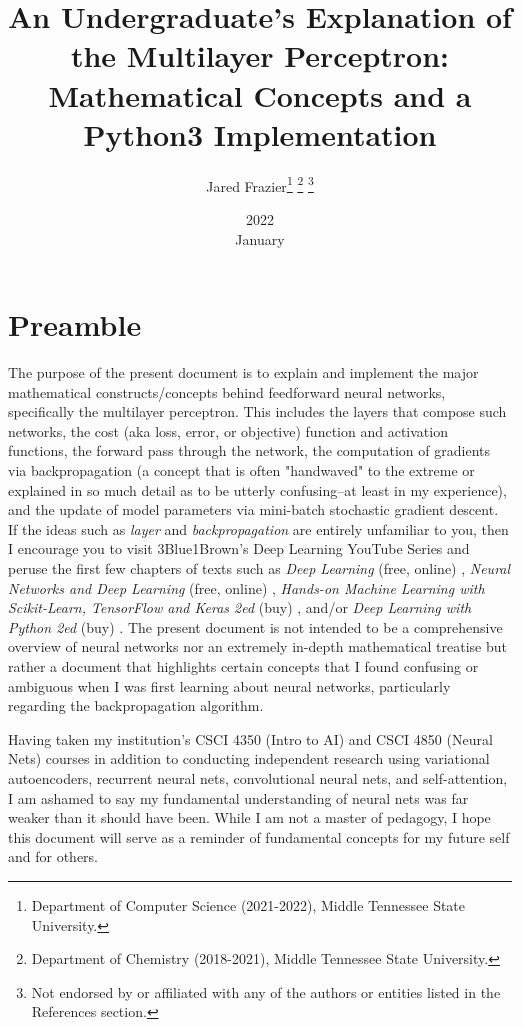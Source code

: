 \documentclass{article}
\title{
	An Undergraduate's Explanation of the Multilayer Perceptron: 
	Mathematical Concepts and a Python3 Implementation}
\date{2022 \\ January}
\author{Jared Frazier\thanks{Department of Computer Science (2021-2022),
Middle Tennessee State University.} \thanks{Department of Chemistry (2018-2021),
Middle Tennessee State University.} \thanks{Not endorsed by or affiliated with any of the 
authors or entities listed in the References section.}}
\begin{document}
\maketitle
\titlepage

\tableofcontents
\pagebreak

\section{Preamble}
\quad The purpose of the present document is to explain and implement the major mathematical
constructs/concepts behind feedforward neural networks, specifically the multilayer perceptron.
This includes the layers that compose such networks, the cost (aka loss, error, or objective) function
and activation functions, the forward pass through the network,
the computation of gradients via backpropagation (a concept that is often "handwaved" to the extreme
or explained in so much detail as to be utterly confusing--at least in my experience),
and the update of model parameters via mini-batch stochastic gradient descent.
If the ideas such as \textit{layer} and \textit{backpropagation} are entirely unfamiliar
to you, then I encourage you to visit 3Blue1Brown's Deep Learning YouTube Series \cite{3Blue1BrownWhatIsANN2017}
and peruse the first few chapters of texts such as \textit{Deep Learning} (free, online) \cite{Goodfellow2016},
\textit{Neural Networks and Deep Learning} (free, online) \cite{Nielsen2015},
\textit{Hands-on Machine Learning with Scikit-Learn, TensorFlow and Keras 2ed} (buy) \cite{Geron2020},
and/or \textit{Deep Learning with Python 2ed} (buy) \cite{Chollet2021}. The present document
is not intended to be a comprehensive overview of neural networks nor an extremely
in-depth mathematical treatise but rather a document that highlights certain concepts that
I found confusing or ambiguous when I was first learning about neural networks,
particularly regarding the backpropagation algorithm.

Having taken my institution's CSCI 4350 (Intro to AI) and CSCI 4850 (Neural Nets)
courses in addition to conducting independent research using
variational autoencoders, recurrent neural nets, convolutional neural nets, and
self-attention, I am ashamed to say my fundamental understanding of neural nets
was far weaker than it should have been. While I am not a master of pedagogy,
I hope this document will serve as a reminder of fundamental concepts for my
future self and for others.
\end{document}
